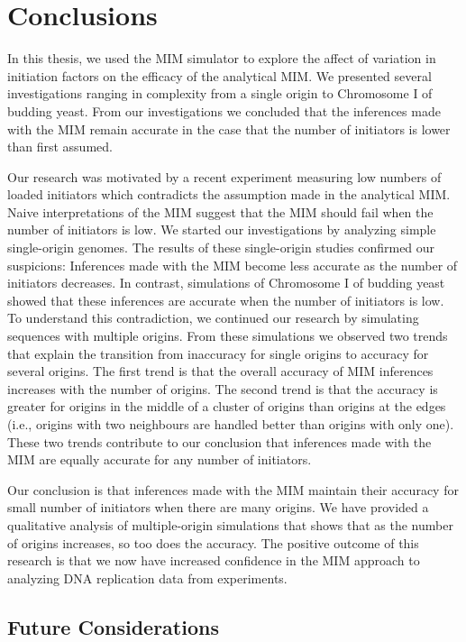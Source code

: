 \chapter{Conclusions}
\label{ch:Conclusions}

In this thesis, we used the MIM simulator to explore the affect of variation in initiation factors on the efficacy of the analytical MIM.
We presented several investigations ranging in complexity from a single origin to Chromosome I of budding yeast.
From our investigations we concluded that the inferences made with the MIM remain accurate in the case that the number of initiators is lower than first assumed.

Our research was motivated by a recent experiment measuring low numbers of loaded initiators which contradicts the assumption made in the analytical MIM.
Naive interpretations of the MIM suggest that the MIM should fail when the number of initiators is low.
We started our investigations by analyzing simple single-origin genomes.
The results of these single-origin studies confirmed our suspicions:
Inferences made with the MIM become less accurate as the number of initiators decreases.
In contrast, simulations of Chromosome I of budding yeast showed that these inferences are accurate when the number of initiators is low.
To understand this contradiction, we continued our research by simulating sequences with multiple origins.
From these simulations we observed two trends that explain the transition from inaccuracy for single origins to accuracy for several origins.
The first trend is that the overall accuracy of MIM inferences increases with the number of origins.
The second trend is that the accuracy is greater for origins in the middle of a cluster of origins than origins at the edges (i.e., origins with two neighbours are handled better than origins with only one).
These two trends contribute to our conclusion that inferences made with the MIM are equally accurate for any number of initiators.

Our conclusion is that inferences made with the MIM maintain their accuracy for small number of initiators when there are many origins.
We have provided a qualitative analysis of multiple-origin simulations that shows that as the number of origins increases, so too does the accuracy.
The positive outcome of this research is that we now have increased confidence in the MIM approach to analyzing DNA replication data from experiments.

	\section{Future Considerations}
	
